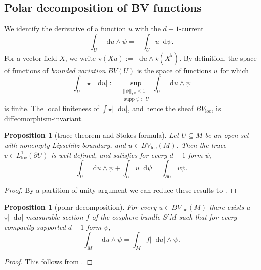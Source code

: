 \documentclass[reqno,10pt]{amsart}
\DeclareMathOperator{\supp}{supp}
\newcommand*\dif{\mathop{}\!\mathrm{d}}
\newcommand{\vol}{\mathrm{vol}}
\newcommand{\dfn}[1]{\emph{#1}\index{#1}}
\newcommand{\loc}{\mathrm{loc}}
\newtheorem{proposition}[theorem]{Proposition}
\theoremstyle{definition}
\numberwithin{equation}{section}
\begin{document}
\subsection{Polar decomposition of BV functions}
We identify the derivative of a function $u$ with the $d-1$-current
$$\int_U \dif u \wedge \psi = -\int_U u \dif \psi.$$
For a vector field $X$, we write $\star (Xu) := \dif u \wedge \star (X^\flat)$.
By definition, the space of functions of \dfn{bounded variation} $BV(U)$ is the space of functions $u$ for which
\begin{equation}\label{total variation}
\int_U \star |\dif u| := \sup_{\substack{||\psi||_{C^0} \leq 1\\\supp \psi \Subset U}} \int_U \dif u \wedge \psi
\end{equation}
is finite.
The local finiteness of $\int \star |\dif u|$, and hence the sheaf $BV_\loc$, is diffeomorphism-invariant.

\begin{proposition}[trace theorem and Stokes formula]
Let $U \subseteq M$ be an open set with nonempty Lipschitz boundary, and $u \in BV_\loc(M)$.
Then the trace $v \in L^1_\loc(\partial U)$ is well-defined,
and satisfies for every $d - 1$-form $\psi$,
\begin{equation}\label{Miranda IBP}
\int_U \dif u \wedge \psi + \int_U u \dif \psi = \int_{\partial U} v\psi.
\end{equation}
\end{proposition}
\begin{proof}
By a partition of unity argument we can reduce these results to \cite[Teorema 1]{Miranda67}.
\end{proof}

\begin{proposition}[polar decomposition]
For every $u \in BV_\loc(M)$ there exists a $\star |\dif u|$-measurable section $f$ of the cosphere bundle $S'M$ such that for every compactly supported $d-1$-form $\psi$,
\begin{equation}\label{RNy formula}
\int_M \dif u \wedge \psi = \int_M f|\dif u| \wedge \psi.
\end{equation}
\end{proposition}
\begin{proof}
This follows from \cite[Theorem 4.14]{simon1983GMT}.
\end{proof}
\end{document}
